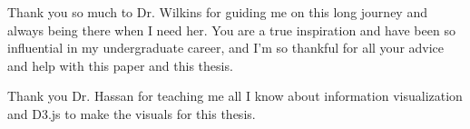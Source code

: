 Thank you so much to Dr. Wilkins for guiding me on this long journey and always being there when I need her. You are a true inspiration and have been so influential in my undergraduate career, and I'm so thankful for all your advice and help with this paper and this thesis.

Thank you Dr. Hassan for teaching me all I know about information visualization and D3.js to make the visuals for this thesis.

